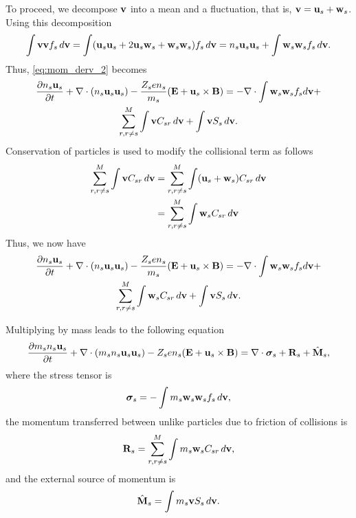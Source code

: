 \documentclass[a4paper,11pt]{report}
\begin{document}
To proceed, we decompose $\mathbf{v}$ into a mean and a fluctuation, that is, $\mathbf{v} = \mathbf{u}_s + \mathbf{w}_s$. Using this decomposition 
\begin{equation}
\label{eq:identity_vv}
\int \mathbf{v} \mathbf{v} f_s \, d\mathbf{v} = \int ( \mathbf{u}_s \mathbf{u}_s + 2 \mathbf{u}_s \mathbf{w}_s + \mathbf{w}_s \mathbf{w}_s) f_s \, d\mathbf{v} = n_s \mathbf{u}_s \mathbf{u}_s + \int \mathbf{w}_s \mathbf{w}_s f_s \, d\mathbf{v}.
\end{equation}
Thus, \cref{eq:mom_derv_2} becomes
\begin{multline}
\label{eq:mom_derv_3}
\frac{\partial n_s \mathbf{u}_s}{\partial t} + \nabla \cdot \left ( n_s \mathbf{u}_s \mathbf{u}_s \right) - \frac{Z_s e n_s}{m_s} ( \mathbf{E} + \mathbf{u}_s \times \mathbf{B} ) = -\nabla \cdot \int \mathbf{w}_s \mathbf{w}_s f_s d\mathbf{v} + \\
\sum_{r, r \ne s}^M \int \mathbf{v} C_{s r} \, d\mathbf{v} + \int \mathbf{v} S_s \, d\mathbf{v}.
\end{multline}
Conservation of particles is used to modify the collisional term as follows
\begin{align}
    \label{eq:mom_collision_expansion}
    \sum_{r,r \ne s}^M \int \mathbf{v} C_{s r} \, d\mathbf{v} 
    &= \sum_{r,r \ne s}^M \int (\mathbf{u}_s + \mathbf{w}_s) C_{s r} \, d\mathbf{v} \nonumber \\
    &= \sum_{r,r \ne s}^M \int \mathbf{w}_s C_{s r} \, d\mathbf{v} 
\end{align}
Thus, we now have
\begin{multline}
\label{eq:mom_derv_4}
\frac{\partial n_s \mathbf{u}_s}{\partial t} + \nabla \cdot \left ( n_s \mathbf{u}_s \mathbf{u}_s \right) - \frac{Z_s e n_s}{m_s} ( \mathbf{E} + \mathbf{u}_s \times \mathbf{B} ) = -\nabla \cdot \int \mathbf{w}_s \mathbf{w}_s f_s d\mathbf{v} + \\
\sum_{r, r \ne s}^M \int \mathbf{w}_s C_{s r} \, d\mathbf{v} + \int \mathbf{v} S_s \, d\mathbf{v}.
\end{multline}

Multiplying by mass leads to the following equation
\begin{equation}
\label{eq:mom_derv_5}
\frac{\partial m_s n_s \mathbf{u}_s}{\partial t} + \nabla \cdot \left ( m_s n_s \mathbf{u}_s \mathbf{u}_s \right) - Z_s e n_s ( \mathbf{E} + \mathbf{u}_s \times \mathbf{B} ) = \nabla \cdot \boldsymbol{\sigma}_s + \mathbf{R}_s + \hat{\mathbf{M}}_s,
\end{equation}
where the stress tensor is
\begin{equation}
\boldsymbol{\sigma}_s = -\int m_s \mathbf{w}_s \mathbf{w}_s f_s \, d\mathbf{v},
\end{equation}
the momentum transferred between unlike particles due to friction of collisions is
\begin{equation}
\mathbf{R}_s = \sum_{r, r \ne s}^M \int m_s \mathbf{w}_s C_{s r} \, d\mathbf{v},
\end{equation}
and the external source of momentum is
\begin{equation}
\hat{\mathbf{M}}_s = \int m_s \mathbf{v} S_s \, d\mathbf{v}.
\end{equation}
 
\end{document}
